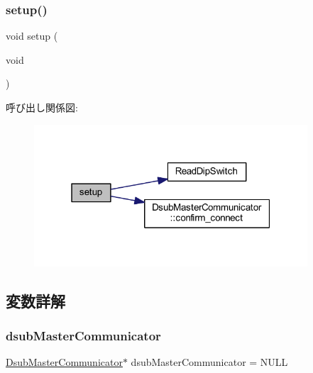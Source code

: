 \subsubsection{\texorpdfstring{setup()}{setup()}}
{\footnotesize\ttfamily void setup (\begin{DoxyParamCaption}\item[{void}]{ }\end{DoxyParamCaption})}

呼び出し関係図\+:
\nopagebreak
\begin{figure}[H]
\begin{center}
\leavevmode
\includegraphics[width=289pt]{start__module_8ino_a7dfd9b79bc5a37d7df40207afbc5431f_cgraph}
\end{center}
\end{figure}


\subsection{変数詳解}
\mbox{\label{start__module_8ino_af3e70438e0875f19cc1cb4cb9f522f80}} 
\subsubsection{\texorpdfstring{dsubMasterCommunicator}{dsubMasterCommunicator}}
{\footnotesize\ttfamily \mbox{\hyperlink{class_dsub_master_communicator}{Dsub\+Master\+Communicator}}$\ast$ dsub\+Master\+Communicator = N\+U\+LL}

\mbox{\label{start__module_8ino_a432be7f3eee18ba7ccdf2ab1d8908ae1}} 

